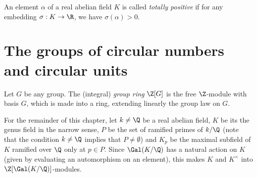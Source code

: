 \iffalse
\begin{lemma}\label{comp}
We have $kK_iK_jK_l=K$ and $K_1K_2K_3K_4=K$.
\end{lemma}
\begin{proof}
The extension $K/K_iK_jK_l$ is totally ramified at the prime ideals above $p_h$, so the same must be true for the extension $K/kK_iK_jK_l$. But since the extension $K/k$ is unramified (by the definition of $K$), so is $K/kK_iK_jK_l$. Therefore $[K:kK_iK_jK_l]=1$. The second claim follows from the facts %
$T_i=\Gal(K/K_jK_lK_h)$ and $G=T_1\times T_2\times T_3\times T_4$.
\end{proof}
\begin{center}
\begin{tikzpicture}
  \node (a) at (0,4)  {$K$};
  \node (b) at (0,2)  {$kK_iK_jK_l$};
  \node (c) at (-3,1)  {$k$};
  \node (d) at (3,1)  {$K_iK_jK_l$};
  \draw[transform canvas={xshift=-1.5pt}] (a) -- (b);
  \draw[transform canvas={xshift=1.5pt}] (b) -- (a);
  \draw   (b) --  (c)
   (b) -- (d);
  \draw[bend left](c) to node [above , sloped]{\text{unramified}}(a);
  \draw[bend right](d) to node [above , sloped]{\text{totally ramified above $p_h$}}(a);
\end{tikzpicture}
\end{center}
\fi

\begin{definition}
An element $\alpha$ of a real abelian field $K$ is called \textit{totally positive} if for any embedding $\sigma: K\to \R$, we have $\sigma(\alpha)>0$.
\end{definition}

\section{The groups of circular numbers and circular units}
\begin{definition}
Let $G$ be any group. The (integral) \textit{group ring} $\Z[G]$ is the free $\Z$-module with basis $G$, which is made into a ring, extending linearly the group law on $G$.
\end{definition}

For the remainder of this chapter, let $k\neq \Q$ be a real abelian field, $K$ be its the genus field in the narrow sense, $P$ be the set of ramified primes of $k/\Q$ (note that the condition $k\neq \Q$ implies that $P\neq \emptyset$) and $K_p$ be the maximal subfield of $K$ ramified over $\Q$ only at $p\in P$. Since $\Gal(K/\Q)$ has a natural action on $K$ (given by evaluating an automorphism on an element), this makes $K$ and $K^{\times}$ into $\Z[\Gal(K/\Q)]$-modules. 

